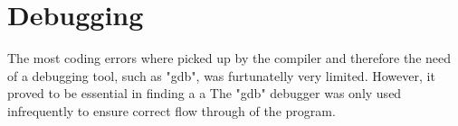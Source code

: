 \section{Debugging}
\label{Debugging}
The most coding errors where picked up by the compiler and therefore the need of a debugging tool, such as "gdb", was furtunatelly very limited.
However, it proved to be essential in finding a a 
The "gdb" debugger was only used infrequently to ensure correct flow through of the program. 
